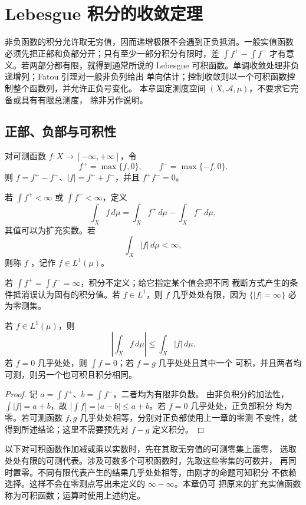 \chapter{Lebesgue 积分的收敛定理}
\label{chap:lebesgue-convergence}

非负函数的积分允许取无穷值，因而递增极限不会遇到正负抵消。一般实值函数
必须先把正部和负部分开；只有至少一部分积分有限时，差
\(\int f^+-\int f^-\) 才有意义。若两部分都有限，就得到通常所说的
Lebesgue 可积函数。单调收敛处理非负递增列；Fatou 引理对一般非负列给出
单向估计；控制收敛则以一个可积函数控制整个函数列，并允许正负号变化。
本章固定测度空间 \((X,\mathcal A,\mu)\)，不要求它完备或具有有限总测度，
除非另作说明。

\section{正部、负部与可积性}

对可测函数 \(f:X\to[-\infty,+\infty]\)，令
\[
 f^+=\max\{f,0\},\qquad f^-=\max\{-f,0\}.
\]
则 \(f=f^+-f^-\)、\(|f|=f^++f^-\)，并且 \(f^+f^-=0\)。

\begin{definition}
若 \(\int f^+<\infty\) 或 \(\int f^-<\infty\)，定义
\[
 \int_Xf\,d\mu=\int_Xf^+\,d\mu-\int_Xf^-\,d\mu,
\]
其值可以为扩充实数。若
\[
 \int_X|f|\,d\mu<\infty,
\]
则称 \(f\) ，记作 \(f\in L^1(\mu)\)。
\end{definition}

若 \(\int f^+=\int f^-=\infty\)，积分不定义；给它指定某个值会把不同
截断方式产生的条件抵消误认为固有的积分值。若 \(f\in L^1\)，则 \(f\)
几乎处处有限，因为 \(\{|f|=\infty\}\) 必为零测集。

\begin{proposition}
\label{prop:integrable-basic-estimate}
若 \(f\in L^1(\mu)\)，则
\[
 \left|\int_Xf\,d\mu\right|\le\int_X|f|\,d\mu .
\]
若 \(f=0\) 几乎处处，则 \(\int f=0\)；若 \(f=g\) 几乎处处且其中一个
可积，并且两者均可测，则另一个也可积且积分相同。
\end{proposition}

\begin{proof}
记 \(a=\int f^+\)、\(b=\int f^-\)，二者均为有限非负数。
由非负积分的加法性，\(\int|f|=a+b\)，故
\(\left|\int f\right|=|a-b|\le a+b\)。若 \(f=0\) 几乎处处，正负部积分
均为零。若可测函数 \(f,g\) 几乎处处相等，分别对正负部使用上一章的零测
不变性，就得到所述结论；这里不需要预先对 \(f-g\) 定义积分。
\end{proof}

以下对可积函数作加减或乘以实数时，先在其取无穷值的可测零集上置零，
选取处处有限的可测代表。涉及可数多个可积函数时，先取这些零集的可数并，
再同时置零。不同有限代表产生的结果几乎处处相等，由刚才的命题可知积分
不依赖选择。这样不会在零测点写出未定义的 \(\infty-\infty\)。本章仍可
把原来的扩充实值函数称为可积函数；运算时使用上述约定。

